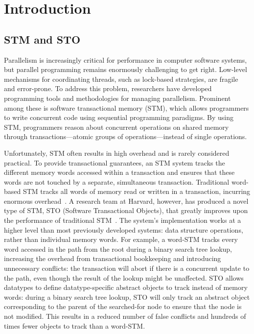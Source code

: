 \chapter{Introduction}
\section{STM and STO}
Parallelism is increasingly critical for performance in computer software systems, but parallel programming remains enormously challenging to get right. Low-level mechanisms for coordinating threads, such as lock-based strategies, are fragile and error-prone. To address this problem, researchers have developed programming tools and methodologies for managing parallelism. Prominent among these is software transactional memory (STM), which allows programmers to write concurrent code using sequential programming paradigms. By using STM, programmers reason about concurrent operations on shared memory through transactions---atomic groups of operations---instead of single operations. 

Unfortunately, STM often results in high overhead and is rarely considered practical. To provide transactional guarantees, an STM system tracks the different memory words accessed within a transaction and ensures that these words are not touched by a separate, simultaneous transaction. Traditional word-based STM tracks all words of memory read or written in a transaction, incurring enormous overhead~\cite{cascaval}. A research team at Harvard, however, has produced a novel type of STM, STO (Software Transactional Objects), that greatly improves upon the performance of traditional STM~\cite{sto}. The system's implementation works at a higher level than most previously developed systems: data structure operations, rather than individual memory words. For example, a word-STM tracks every word accessed in the path from the root during a binary search tree lookup, increasing the overhead from transactional bookkeeping and introducing unnecessary conflicts: the transaction will abort if there is a concurrent update to the path, even though the result of the lookup might be unaffected. STO allows datatypes to define datatype-specific abstract objects to track instead of memory words: during a binary search tree lookup, STO will only track an abstract object corresponding to the parent of the searched-for node to ensure that the node is not modified. This results in a reduced number of false conflicts and hundreds of times fewer objects to track than a word-STM. 

